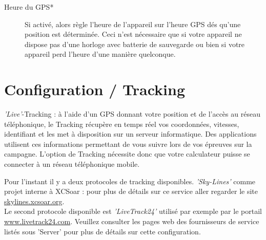 \begin{description}
\item[Heure du GPS*] Si activé, alors règle l'heure de l'appareil sur l'heure GPS dés qu'une position est déterminée. Ceci n'est nécessaire que si votre appareil ne dispose pas d'une horloge avec batterie de sauvegarde ou bien si votre appareil perd l'heure d'une manière quelconque.
\end{description}


\section{Configuration / Tracking}

{\it 'Live'}-Tracking : à l'aide d'un GPS donnant votre position et de l'accès au réseau téléphonique, le Tracking récupère en temps réel vos coordonnées, vitesses, identifiant et les met à disposition sur un serveur informatique. Des applications utilisent ces informations permettant de vous suivre lors de vos épreuves sur la campagne. L'option de Tracking nécessite donc que votre calculateur puisse se connecter à un réseau téléphonique mobile. 

Pour l'instant il y a deux protocoles de tracking disponibles. {\it 'Sky-Lines'} comme projet interne à XCSoar : pour plus de détails sur ce service aller regarder le site {\href{http://skylines.xcsoar.org}{skylines.xcsoar.org}}.\\
Le second protocole disponible est {\it 'LiveTrack24'} utilisé par exemple par le portail {\href{http://www.livetrack24.com}{www.livetrack24.com}}. Veuillez consulter les pages web des fournisseurs de service listés sous 'Server' pour plus de détails sur cette configuration.

